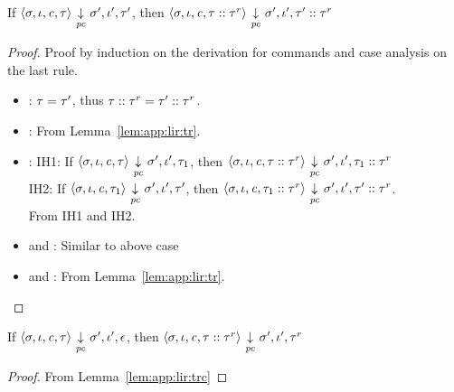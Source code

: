 \begin{myLemma}
\label{lem:app:lir:trc}
If $ \langle \sigma, \iota, \mathit{c}, \tau \rangle {~\underset{\mathit{pc}}{\downarrow}~} \sigma',
\iota', \tau'$, then $ \langle \sigma, \iota, \mathit{c},
\tau::\tau^r \rangle {~\underset{\mathit{pc}}{\downarrow}~} \sigma', \iota', \tau'::\tau^r$ 
\end{myLemma}
\begin{proof}
  Proof by induction on the derivation for commands and case analysis
  on the last rule.
  \begin{itemize}
  \item {}:  $\tau = \tau'$, thus $\tau::\tau^r =
    \tau'::\tau^r$. 
  \item {}: From Lemma~\ref{lem:app:lir:tr}.
  \item {}: IH1: If $ \langle \sigma, \iota, \mathit{c}, \tau \rangle {~\underset{\mathit{pc}}{\downarrow}~} \sigma',
    \iota', \tau_1$, then $ \langle \sigma, \iota, \mathit{c},
    \tau::\tau^r \rangle {~\underset{\mathit{pc}}{\downarrow}~} \sigma', \iota',
    \tau_1::\tau^r$\\
    IH2: If $ \langle \sigma, \iota, \mathit{c}, \tau_1 \rangle {~\underset{\mathit{pc}}{\downarrow}~} \sigma',
    \iota', \tau'$, then $ \langle \sigma, \iota, \mathit{c},
    \tau_1::\tau^r \rangle {~\underset{\mathit{pc}}{\downarrow}~} \sigma', \iota',
    \tau'::\tau^r$. \\ From IH1 and IH2.
  \item {} and : Similar to above case
  \item {} and : From Lemma~\ref{lem:app:lir:tr}.
\end{itemize}
\end{proof}

\begin{mycor}
\label{cor:app:lir:tred}
If $ \langle \sigma, \iota, \mathit{c}, \tau \rangle {~\underset{\mathit{pc}}{\downarrow}~} \sigma',
\iota', \epsilon$, then $ \langle \sigma, \iota, \mathit{c},
\tau::\tau^r \rangle {~\underset{\mathit{pc}}{\downarrow}~} \sigma', \iota', \tau^r$ 
\end{mycor}
\begin{proof}
From Lemma~\ref{lem:app:lir:trc}
\end{proof}

